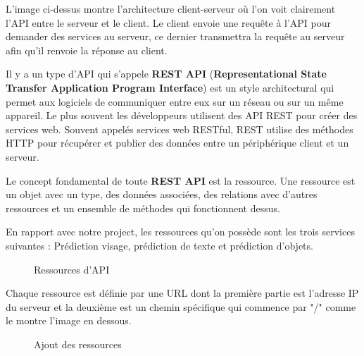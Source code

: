 {L'image ci-dessus montre l'architecture client-serveur où l'on voit clairement l'API entre le serveur et le client. Le client envoie une requête à l'API pour demander des services au serveur, ce dernier transmettra la requête au serveur afin qu'il renvoie la réponse au client.

Il y a un type d'API qui s'appele \textbf{REST API} (\textbf{Representational State Transfer Application Program Interface}) est un style architectural qui permet aux logiciels de communiquer entre eux sur un réseau ou sur un même appareil. Le plus souvent les développeurs utilisent des API REST pour créer des services web. Souvent appelés services web RESTful, REST utilise des méthodes HTTP pour récupérer et publier des données entre un périphérique client et un serveur.

Le concept fondamental de toute \textbf{REST API} est la ressource. Une ressource est un objet avec un type, des données associées, des relations avec d'autres ressources et un ensemble de méthodes qui fonctionnent dessus.

En rapport avec notre project, les ressources qu'on possède sont les trois services suivantes : Prédiction visage, prédiction de texte et prédiction d'objets.\\[0.5cm]

\begin{figure}[H] 
\centering
{}
\caption{Ressources d'API}
\label{fig:figure8}
\end{figure}
Chaque ressource est définie par une URL dont la première partie est l'adresse IP du serveur et la deuxième est un chemin spécifique qui commence par "/" comme le montre l'image en dessous.

\begin{figure}[H] 
\centering
{}
\caption{Ajout des ressources}
\label{fig:figure9}
\end{figure}

}
